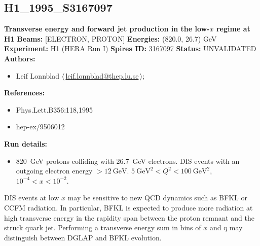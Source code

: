 \clearpage


\clearpage

\subsection[H1\_1995\_S3167097]{H1\_1995\_S3167097\,\cite{Aid:1995we}}
\textbf{Transverse energy and forward jet production in the low-$x$ regime at H1}\newline
\textbf{Beams:} [ELECTRON, PROTON] \newline
\textbf{Energies:} (820.0, 26.7) GeV \newline
\textbf{Experiment:} H1 (HERA Run I) \newline
\textbf{Spires ID:} \href{http://www.slac.stanford.edu/spires/find/hep/www?rawcmd=key+3167097}{3167097}\newline
\textbf{Status:} UNVALIDATED\newline
\textbf{Authors:}
\begin{itemize}
  \item Leif Lonnblad $\langle\,$\href{mailto:leif.lonnblad@thep.lu.se}{leif.lonnblad@thep.lu.se}$\,\rangle$;
\end{itemize}
\textbf{References:}
\begin{itemize}
  \item Phys.Lett.B356:118,1995
  \item hep-ex/9506012
\end{itemize}
\textbf{Run details:}
\begin{itemize}

  \item 820~GeV protons colliding with 26.7~GeV electrons. DIS events with an outgoing electron energy $> 12~\text{GeV}$. $5~\text{GeV}^2 < Q^2 < 100~\text{GeV}^2$, $10^{-4} < x < 10^{-2}$.\end{itemize}

\noindent DIS events at low $x$ may be sensitive to new QCD dynamics such as BFKL or CCFM radiation. In particular, BFKL is expected to produce more radiation at high transverse energy  in the rapidity span between the proton remnant and the struck quark jet. Performing a transverse energy sum in bins of $x$ and $\eta$ may distinguish between DGLAP and BFKL evolution.

\clearpage


\clearpage

